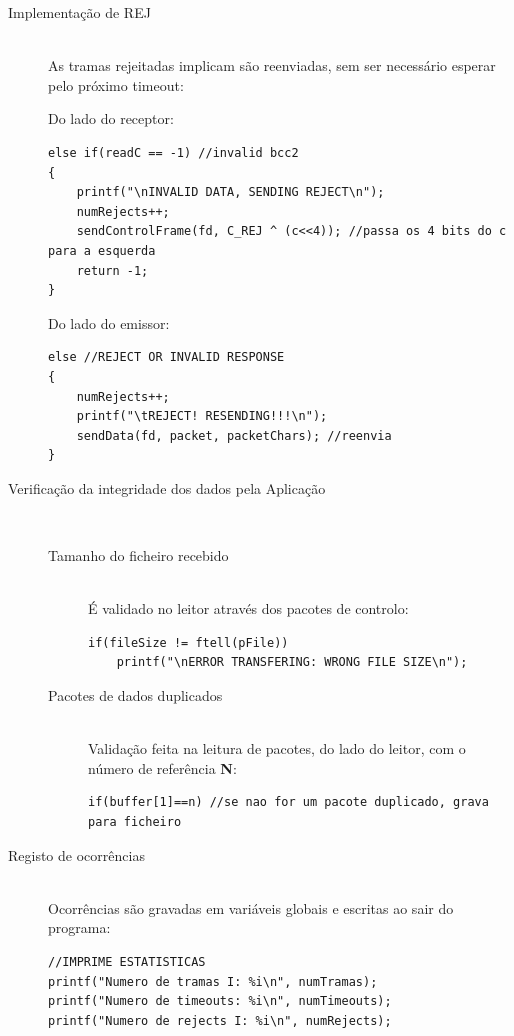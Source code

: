 \documentclass[a4paper,11pt]{article}
\begin{document}
\begin{description}
\item[Implementação de REJ] \hfill \\
As tramas rejeitadas implicam são reenviadas, sem ser necessário esperar pelo próximo timeout:

Do lado do receptor:
\begin{lstlisting}
else if(readC == -1) //invalid bcc2
{
    printf("\nINVALID DATA, SENDING REJECT\n");
    numRejects++;
    sendControlFrame(fd, C_REJ ^ (c<<4)); //passa os 4 bits do c para a esquerda
    return -1;
}
\end{lstlisting}
	Do lado do emissor:
\begin{lstlisting}
else //REJECT OR INVALID RESPONSE
{
    numRejects++;
    printf("\tREJECT! RESENDING!!!\n");
    sendData(fd, packet, packetChars); //reenvia
}
\end{lstlisting}

\item[Verificação da integridade dos dados pela Aplicação] \hfill \\
\begin{description}
\item[Tamanho do ficheiro recebido] \hfill \\
É validado no leitor através dos pacotes de controlo:
\begin{lstlisting}
if(fileSize != ftell(pFile))
    printf("\nERROR TRANSFERING: WRONG FILE SIZE\n");
\end{lstlisting}

\item[Pacotes de dados duplicados] \hfill \\
Validação feita na leitura de pacotes, do lado do leitor, com o número de referência \textbf{N}:

\begin{lstlisting}
if(buffer[1]==n) //se nao for um pacote duplicado, grava para ficheiro
\end{lstlisting}

\end{description}

\item[Registo de ocorrências] \hfill \\
Ocorrências são gravadas em variáveis globais e escritas ao sair do programa:

\begin{lstlisting}
//IMPRIME ESTATISTICAS
printf("Numero de tramas I: %i\n", numTramas);
printf("Numero de timeouts: %i\n", numTimeouts);
printf("Numero de rejects I: %i\n", numRejects);
\end{lstlisting}

\end{description}
\end{document}
